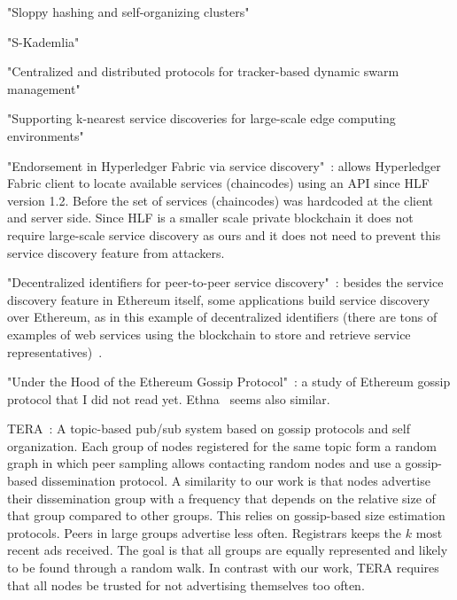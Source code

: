 "Sloppy hashing and self-organizing clusters"~\cite{freedman2003sloppy}

"S-Kademlia"~\cite{pecori2016s}

"Centralized and distributed protocols for tracker-based dynamic swarm management"~\cite{dan2012centralized}

"Supporting k-nearest service discoveries for large-scale edge computing environments"~\cite{teranishi2018supporting}

"Endorsement in Hyperledger Fabric via service discovery"~\cite{manevich2019endorsement}: allows Hyperledger Fabric client to locate available services (chaincodes) using an API since HLF version 1.2. Before the set of services (chaincodes) was hardcoded at the client and server side. Since HLF is a smaller scale private blockchain it does not require large-scale service discovery as ours and it does not need to prevent this service discovery feature from attackers.

"Decentralized identifiers for peer-to-peer service discovery"~\cite{farmer2021decentralized}: besides the service discovery feature in Ethereum itself, some applications build service discovery over Ethereum, as in this example of decentralized identifiers (there are tons of examples of web services using the blockchain to store and retrieve service representatives)~\cite{keizer2021flock}.

"Under the Hood of the Ethereum Gossip Protocol"~\cite{kiffer2021under}: a study of Ethereum gossip protocol that I did not read yet.
Ethna~\cite{wang2021ethna} seems also similar.

TERA~\cite{baldoni2007tera}: A topic-based pub/sub system based on gossip protocols and self organization. Each group of nodes registered for the same topic form a random graph in which peer sampling allows contacting random nodes and use a gossip-based dissemination protocol. A similarity to our work is that nodes advertise their dissemination group with a frequency that depends on the relative size of that group compared to other groups. This relies on gossip-based size estimation protocols. Peers in large groups advertise less often. Registrars keeps the $k$ most recent ads received. The goal is that all groups are equally represented and likely to be found through a random walk. In contrast with our work, TERA requires that all nodes be trusted for not advertising themselves too often.
